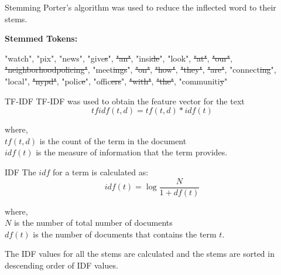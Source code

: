 \documentclass[12pt]{beamer}
\begin{document}
\begin{frame}{Stemming}
    Porter's \autocite{porter1980algorithm} algorithm was used to reduce the inflected word to their stems.

    \textbf{Stemmed Tokens:} \par
    "watch", "pix", "news", "give\sout{s}", \sout{"an"}, "insi\sout{de}", "look", \sout{"at"}, \sout{"our"}, \sout{"neighborhoodpolicing"}, "meet\sout{ings}", \sout{"on"}, \sout{"how"}, \sout{"they"}, \sout{"are"}, "connect\sout{ing}", "local", \sout{"nypd"}, "polic\sout{e}", "offic\sout{ers}", \sout{"with"}, \sout{"the"}, "communiti\sout{y}"

\end{frame}

\begin{frame}{TF-IDF}
TF-IDF\autocite{sparck1972statistical} was used to obtain the feature vector for the text
    \begin{equation}
        \label{eq:tf_idf_equation}
        tfidf(t, d) = tf(t, d) * idf(t)
    \end{equation}

    where, \\
    $tf(t, d)$ is the count of the term in the document \\
    $idf(t)$ is the measure of information that the term provides.
\end{frame}

\begin{frame}{IDF}
The $idf$ for a term is calculated as:
\begin{equation}
    \label{eq:idf_equation}
    idf(t) = \log{\frac{N}{1 + df(t)}}
\end{equation}

where, \\
    $N$ is the number of total number of documents \\
    $df(t)$ is the number of documents that contains the term $t$.

The IDF values for all the stems are calculated and the stems are sorted in descending order of IDF values.
\end{frame}
\end{document}
